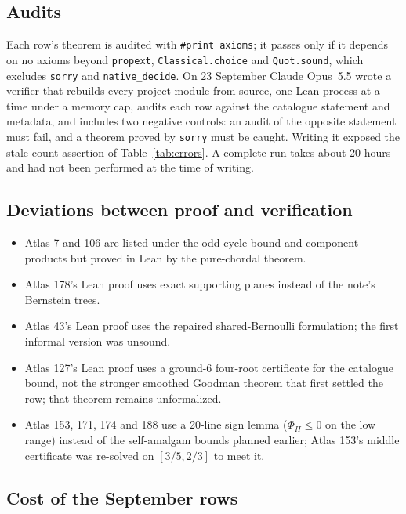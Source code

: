 \documentclass[11pt,a4paper]{article}
\newcommand{\ttt}[1]{\texttt{#1}}
\begin{document}
\subsection{Audits}

Each row's theorem is audited with \ttt{\#print axioms}; it passes only if it depends on no axioms beyond
\ttt{propext}, \ttt{Classical.choice} and \ttt{Quot.sound}, which excludes \ttt{sorry} and
\ttt{native\_decide}. On 23 September Claude Opus~5.5 wrote a verifier that rebuilds every project module from
source, one Lean process at a time under a memory cap, audits each row against the catalogue statement and
metadata, and includes two negative controls: an audit of the opposite statement must fail, and a theorem proved
by \ttt{sorry} must be caught. Writing it exposed the stale count assertion of Table~\ref{tab:errors}. A complete
run takes about 20 hours and had not been performed at the time of writing.

\subsection{Deviations between proof and verification}\label{app:deviations}

\begin{itemize}
\item Atlas 7 and 106 are listed under the odd-cycle bound and component products but proved in Lean by the
  pure-chordal theorem.
\item Atlas 178's Lean proof uses exact supporting planes instead of the note's Bernstein trees.
\item Atlas 43's Lean proof uses the repaired shared-Bernoulli formulation; the first informal version was
  unsound.
\item Atlas 127's Lean proof uses a ground-6 four-root certificate for the catalogue bound, not the stronger
  smoothed Goodman theorem that first settled the row; that theorem remains unformalized.
\item Atlas 153, 171, 174 and 188 use a 20-line sign lemma ($\Phi_H\le0$ on the low range) instead of the
  self-amalgam bounds planned earlier; Atlas 153's middle certificate was re-solved on $[3/5,2/3]$ to meet it.
\end{itemize}

\subsection{Cost of the September rows}\label{app:costs}
\end{document}
